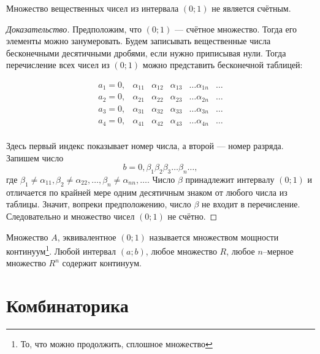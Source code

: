 \begin{theorem}
  Множество вещественных чисел из интервала $(0; 1)$ не является счётным.

  \begin{proof}[Доказательство]
    Предположим, что $(0;1)$ --- счётное множество. Тогда его элементы можно
    занумеровать. Будем записывать вещественные числа бесконечными десятичными
    дробями, если нужно приписывая нули. Тогда перечисление всех чисел из
    $(0;1)$ можно представить бесконечной таблицей:

    \[
      \begin{matrix}
        a_1 = 0,    & \alpha_{11} & \alpha_{12} & \alpha_{13} & \ldots
        \alpha_{1n} & \ldots                                           \\
        a_2 = 0,    & \alpha_{21} & \alpha_{22} & \alpha_{23} & \ldots
        \alpha_{2n} & \ldots                                           \\
        a_3 = 0,    & \alpha_{31} & \alpha_{32} & \alpha_{33} & \ldots
        \alpha_{3n} & \ldots                                           \\
        a_4 = 0,    & \alpha_{41} & \alpha_{42} & \alpha_{43} & \ldots
        \alpha_{4n} & \ldots                                           \\
      \end{matrix}
    \]

    Здесь первый индекс показывает номер числа, а второй --- номер
    разряда. Запишем число
    \[
      b = 0, \beta_1 \beta_2 \beta_3 \dots \beta_n \dots
    ,\]
    где $\beta_1 \neq \alpha_{11}, \beta_2 \neq \alpha_{22}, \dots,
    \beta_n \neq \alpha_{nn}, \dots$. Число $\beta$ принадлежит
    интервалу $(0;1)$ и отличается по крайней мере одним десятичным
    знаком от любого числа из таблицы. Значит, вопреки предположению,
    число $\beta$ не входит в перечисление. Следовательно и множество
    чисел $(0;1)$ не счётно.
  \end{proof}
\end{theorem}

Множество $A$, эквивалентное $(0;1)$ называется множеством мощности
континуум\footnote{То, что можно продолжить, сплошное
множество}. Любой интервал $(a;b)$, любое множество $R$, любое $n$--мерное
множество $R^n$ содержит континуум.

\chapter{Комбинаторика}

